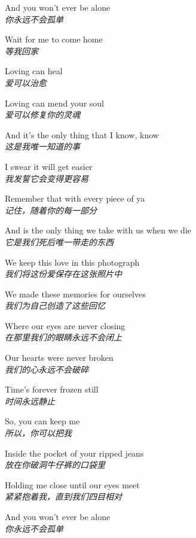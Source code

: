 \begin{spacing}{1.5}
\begin{flushleft}
And you won't ever be alone\\
\textit{你永远不会孤单}\lyricspace

Wait for me to come home\\
\textit{等我回家}\lyricspace

Loving can heal\\
\textit{爱可以治愈}\lyricspace

Loving can mend your soul\\
\textit{爱可以修复你的灵魂}\lyricspace

And it's the only thing that I know, know\\
\textit{这是我唯一知道的事}\lyricspace

I swear it will get easier\\
\textit{我发誓它会变得更容易}\lyricspace

Remember that with every piece of ya\\
\textit{记住，随着你的每一部分}\lyricspace

And is the only thing we take with us when we die\\
\textit{它是我们死后唯一带走的东西}\lyricspace

We keep this love in this photograph\\
\textit{我们将这份爱保存在这张照片中}\lyricspace

We made these memories for ourselves\\
\textit{我们为自己创造了这些回忆}\lyricspace

Where our eyes are never closing\\
\textit{在那里我们的眼睛永远不会闭上}\lyricspace

Our hearts were never broken\\
\textit{我们的心永远不会破碎}\lyricspace

Time's forever frozen still\\
\textit{时间永远静止}\lyricspace

So, you can keep me\\
\textit{所以，你可以把我}\lyricspace

Inside the pocket of your ripped jeans\\
\textit{放在你破洞牛仔裤的口袋里}\lyricspace

Holding me close until our eyes meet\\
\textit{紧紧抱着我，直到我们四目相对}\lyricspace

And you won't ever be alone\\
\textit{你永远不会孤单}\lyricspace


\end{flushleft}
\end{spacing}
